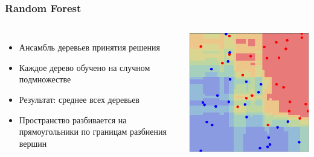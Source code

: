 \documentclass{beamer}
\begin{document}
\begin{frame} \frametitle{Random Forest}
    \begin{columns}
            \begin{itemize}
                \item Ансамбль деревьев принятия решения
                \item Каждое дерево обучено на случном подмножестве
                \item Результат: среднее всех деревьев 
                \item Пространство разбивается на прямоугольники по границам разбиения вершин
            \end{itemize}
        \includegraphics[width=\textwidth]{random_forest.png}
    \end{columns}
\end{frame}
\end{document}
